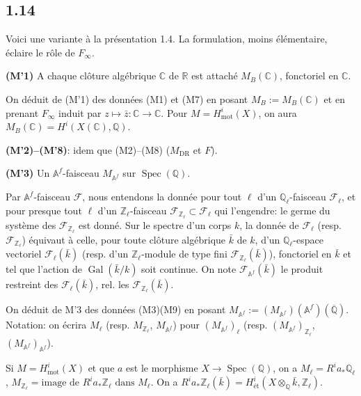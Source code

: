 \documentclass[12pt,a4paper]{article}
\theoremstyle{plain}
\theoremstyle{definition}
\theoremstyle{remark}
\DeclareMathOperator{\Spec}{Spec}
\DeclareMathOperator{\Gal}{Gal}
\newcommand{\mot}{\mathrm{mot}}
\providecommand{\Gal}{\operatorname{Gal}}
\providecommand{\Spec}{\operatorname{Spec}}
\providecommand{\mot}{\mathrm{mot}}
\providecommand{\DR}{\mathrm{DR}}
\begin{document}
\subsection*{1.14}

Voici une variante \`a la pr\'esentation 1.4. La formulation, moins \'el\'ementaire,
\'eclaire le r\^ole de $F_\infty$.

\textbf{(M'1)} A chaque cl\^oture alg\'ebrique $\mathbb{C}$ de $\mathbb{R}$ est attach\'e
$M_B(\mathbb{C})$, fonctoriel en $\mathbb{C}$.

On d\'eduit de (M'1) des donn\'ees (M1) et (M7) en posant $M_B := M_B(\mathbb{C})$ et en
prenant $F_\infty$ induit par $z \mapsto \bar{z}: \mathbb{C} \to \mathbb{C}$. Pour
$M = H^i_\mot(X)$, on aura $M_B(\mathbb{C}) = H^i(X(\mathbb{C}), \mathbb{Q})$.

\textbf{(M'2)--(M'8)}: idem que (M2)--(M8) ($M_{\DR}$ et $F$).

\textbf{(M'3)} Un $\mathbb{A}^f$-faisceau $M_{\mathbb{A}^f}$ sur $\Spec(\mathbb{Q})$.

Par $\mathbb{A}^f$-faisceau $\mathcal{F}$, nous entendons la donn\'ee pour tout $\ell$ d'un
$\mathbb{Q}_\ell$-faisceau $\mathcal{F}_\ell$, et pour presque tout $\ell$ d'un
$\mathbb{Z}_\ell$-faisceau $\mathcal{F}_{\mathbb{Z}_\ell} \subset \mathcal{F}_\ell$ qui
l'engendre: le germe du syst\`eme des $\mathcal{F}_{\mathbb{Z}_\ell}$ est donn\'e. Sur le
spectre d'un corps $k$, la donn\'ee de $\mathcal{F}_\ell$ (resp.
$\mathcal{F}_{\mathbb{Z}_\ell}$) \'equivaut \`a celle, pour toute cl\^oture alg\'ebrique
$\bar{k}$ de $k$, d'un $\mathbb{Q}_\ell$-espace vectoriel
$\mathcal{F}_\ell(\bar{k})$ (resp. d'un $\mathbb{Z}_\ell$-module de type fini
$\mathcal{F}_{\mathbb{Z}_\ell}(\bar{k})$), fonctoriel en $\bar{k}$ et tel que l'action de
$\Gal(\bar{k}/k)$ soit continue. On note $\mathcal{F}_{\mathbb{A}^f}(\bar{k})$ le produit
restreint des $\mathcal{F}_\ell(\bar{k})$, rel. les $\mathcal{F}_{\mathbb{Z}_\ell}(\bar{k})$.

On d\'eduit de M'3 des donn\'ees (M3)(M9) en posant $M_{\mathbb{A}^f} :=
(M_{\mathbb{A}^f})(\mathbb{A}^f)(\overline{\mathbb{Q}})$. Notation: on \'ecrira
$M_\ell$ (resp. $M_{\mathbb{Z}_\ell}$, $M_{\mathbb{A}^f}$) pour
$(M_{\mathbb{A}^f})_\ell$ (resp. $(M_{\mathbb{A}^f})_{\mathbb{Z}_\ell}$,
$(M_{\mathbb{A}^f})_{\mathbb{A}^f}$).

Si $M = H^i_\mot(X)$ et que $a$ est le morphisme $X \to \Spec(\mathbb{Q})$, on a
$M_\ell = R^i a_* \mathbb{Q}_\ell$, $M_{\mathbb{Z}_\ell} = \text{image de } R^i a_*
\mathbb{Z}_\ell \text{ dans } M_\ell$. On a $R^i a_* \mathbb{Z}_\ell(\bar{k}) =
H^i_\text{\'et}(X \otimes_{\mathbb{Q}} \bar{k}, \mathbb{Z}_\ell)$.
\end{document}

